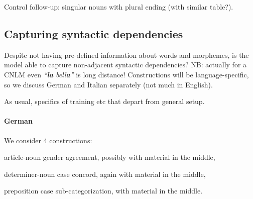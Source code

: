 Control follow-up: singular nouns with plural ending (with similar table?).

\subsection{Capturing syntactic dependencies}
\label{sec:dependencies}

Despite not having pre-defined information about words and morphemes,
is the model able to capture non-adjacent syntactic dependencies? NB:
actually for a CNLM even \emph{``\textbf{la} bell\textbf{a}''} is long
distance! Constructions will be language-specific, so we discuss
German and Italian separately (not much in English).

As usual, specifics of training etc that depart from general setup.

\paragraph{German} We consider 4 constructions:
\begin{inparaenum}[i)]
\item article-noun gender agreement, possibly with material in the middle,
\item determiner-noun case concord, again with material in the middle,
\item preposition case sub-categorization, with material in the middle.
\end{inparaenum}



